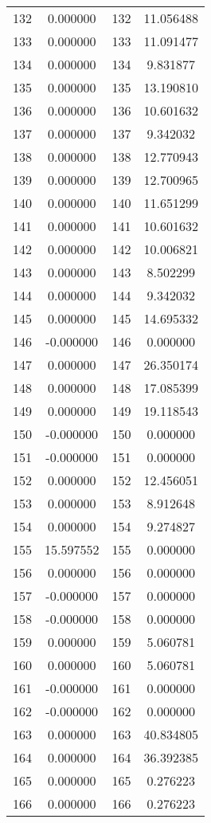 \documentclass[12pt]{article}
\begin{document}
\begin{longtable}{@{}cccc@{}}
132 & 0.000000 & 132 & 11.056488 \\
133 & 0.000000 & 133 & 11.091477 \\
134 & 0.000000 & 134 & 9.831877 \\
135 & 0.000000 & 135 & 13.190810 \\
136 & 0.000000 & 136 & 10.601632 \\
137 & 0.000000 & 137 & 9.342032 \\
138 & 0.000000 & 138 & 12.770943 \\
139 & 0.000000 & 139 & 12.700965 \\
140 & 0.000000 & 140 & 11.651299 \\
141 & 0.000000 & 141 & 10.601632 \\
142 & 0.000000 & 142 & 10.006821 \\
143 & 0.000000 & 143 & 8.502299 \\
144 & 0.000000 & 144 & 9.342032 \\
145 & 0.000000 & 145 & 14.695332 \\
146 & -0.000000 & 146 & 0.000000 \\
147 & 0.000000 & 147 & 26.350174 \\
148 & 0.000000 & 148 & 17.085399 \\
149 & 0.000000 & 149 & 19.118543 \\
150 & -0.000000 & 150 & 0.000000 \\
151 & -0.000000 & 151 & 0.000000 \\
152 & 0.000000 & 152 & 12.456051 \\
153 & 0.000000 & 153 & 8.912648 \\
154 & 0.000000 & 154 & 9.274827 \\
155 & 15.597552 & 155 & 0.000000 \\
156 & 0.000000 & 156 & 0.000000 \\
157 & -0.000000 & 157 & 0.000000 \\
158 & -0.000000 & 158 & 0.000000 \\
159 & 0.000000 & 159 & 5.060781 \\
160 & 0.000000 & 160 & 5.060781 \\
161 & -0.000000 & 161 & 0.000000 \\
162 & -0.000000 & 162 & 0.000000 \\
163 & 0.000000 & 163 & 40.834805 \\
164 & 0.000000 & 164 & 36.392385 \\
165 & 0.000000 & 165 & 0.276223 \\
166 & 0.000000 & 166 & 0.276223 \\

\end{longtable}
\end{document}
